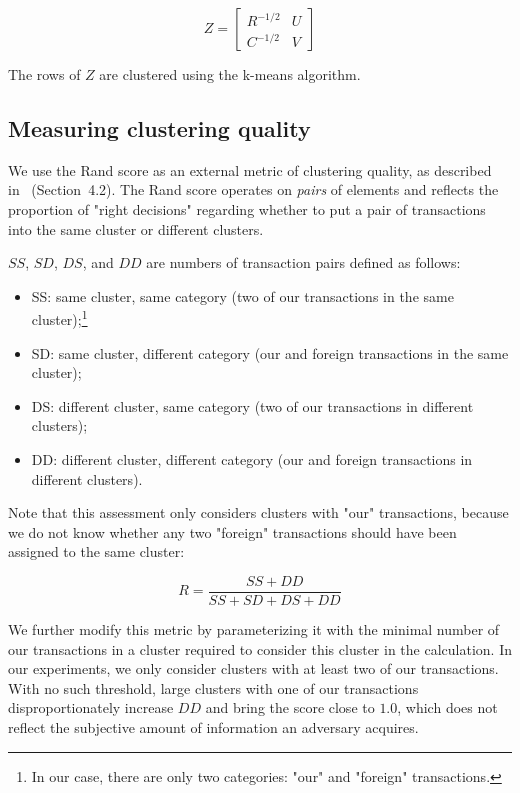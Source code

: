\[
Z = 
\begin{bmatrix}
R^{-1/2} & U \\
C^{-1/2} & V
\end{bmatrix}
\]

The rows of $Z$ are clustered using the k-means algorithm.


\subsection{Measuring clustering quality}

We use the Rand score as an external metric of clustering quality, as described in~\cite{Amigo2009} (Section~4.2).
The Rand score operates on \textit{pairs} of elements and reflects the proportion of "right decisions" regarding whether to put a pair of transactions into the same cluster or different clusters.

$SS$, $SD$, $DS$, and $DD$ are numbers of transaction pairs defined as follows:
\begin{itemize}
	\item SS: same cluster, same category (two of our transactions in the same cluster);\footnote{In our case, there are only two categories: "our" and "foreign" transactions.}
	\item SD: same cluster, different category (our and foreign transactions in the same cluster);
	\item DS: different cluster, same category (two of our transactions in different clusters);
	\item DD: different cluster, different category (our and foreign transactions in different clusters).
\end{itemize}

Note that this assessment only considers clusters with "our" transactions, because we do not know whether any two "foreign" transactions should have been assigned to the same cluster:

\[
R = \frac{SS + DD}{SS + SD + DS + DD}
\]

We further modify this metric by parameterizing it with the minimal number of our transactions in a cluster required to consider this cluster in the calculation.
In our experiments, we only consider clusters with at least two of our transactions.
With no such threshold, large clusters with one of our transactions disproportionately increase $DD$ and bring the score close to $1.0$, which does not reflect the subjective amount of information an adversary acquires.

